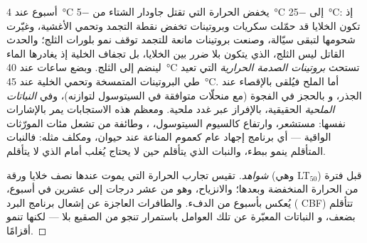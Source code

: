 \begin{proposition}\label{prop:b2:plant-plasticity:stress}
أسبوع عند \qty{4}{\celsius} يخفض الحرارة التي تقتل
جاودار الشتاء من \qty{-5}{\celsius} إلى \qty{-25}{\celsius}: إذ
تكون الخلايا قد حمّلت سكريات وبروتينات تخفض نقطة التجمد
وتحمي الأغشية، وغيّرت شحومها لتبقى سيّالة، وصنعت
بروتينات مانعة للتجمد توقف نمو بلورات الثلج؛ والحدث القاتل
ليس الثلج، الذي يتكون بلا ضرر بين الخلايا، بل
تجفاف الخلية إذ يغادرها الماء لينضم إلى الثلج. وبضع
ساعات عند \qty{40}{\celsius} تستحث \emph{بروتينات الصدمة الحرارية} التي
تعيد طي البروتينات المتمسخة وتحمي الخلية عند
\qty{45}{\celsius}. أما الملح فيُلقى بالإقصاء عند الجذر، و
بالحجز في الفجوة (مع منحلّات متوافقة في
السيتوسول لتوازنه)، وفي \emph{النباتات الملحية} الحقيقية، بالإفراز
عبر غدد ملحية. ومعظم هذه الاستجابات يمر بالإشارات
نفسها: مستشعر، وارتفاع كالسيوم السيتوسول، ،
وطائفة من  تشعل مئات
المورّثات الواقية --- أي برنامج إجهاد عام كعموم المناعة
عند حيوان، ومكلف مثله: فالنبات المتأقلم
ينمو ببطء، والنبات الذي يتأقلم حين لا يحتاج يُغلب أمام
الذي لا يتأقلم.
\end{proposition}
\begin{proof}[شواهد]
تقيس تجارب  الحرارة التي يموت عندها نصف
خلايا ورقة (وهي LT$_{50}$) قبل فترة من الحرارة
المنخفضة وبعدها؛ والانزياح، وهو من عشر درجات إلى عشرين في أسبوع،
يُعكس بأسبوع من الدفء. والطافرات العاجزة عن إشعال برنامج
البرد ( CBF) تتأقلم بضعف، و
النباتات المعبّرة عن تلك العوامل باستمرار تنجو من الصقيع
بلا  --- لكنها تنمو أقزامًا.
\end{proof}

